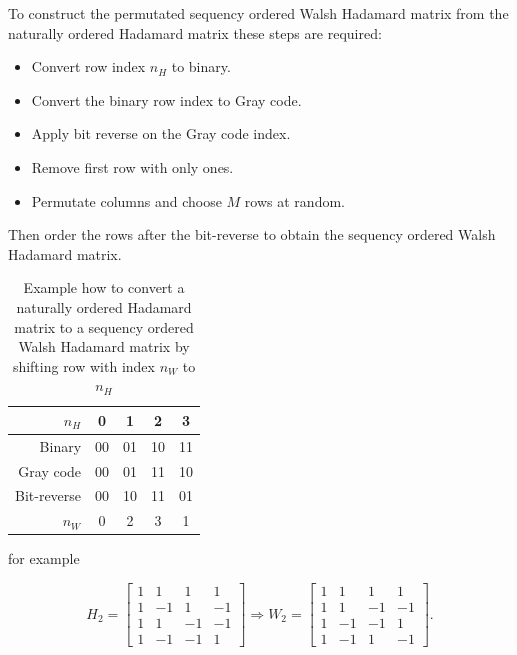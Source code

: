 To construct the permutated sequency ordered Walsh Hadamard matrix from the naturally ordered Hadamard matrix these steps are required:

\begin{itemize}
    \item Convert row index $n_H$ to binary.
    \item Convert the binary row index to Gray code.
    \item Apply bit reverse on the Gray code index.
    \item Remove first row with only ones.
    \item Permutate columns and choose $M$ rows at random.
\end{itemize}

Then order the rows after the bit-reverse to obtain the sequency ordered Walsh Hadamard matrix.

\begin{table}[H]
\begin{tabular}{|r|c|c|c|c|}
\hline
    $n_H$        & 0    & 1     & 2     & 3     \\ \hline
    Binary       & 00   & 01    & 10    & 11    \\ \hline
    Gray code    & 00   & 01    & 11    & 10    \\ \hline
    Bit-reverse  & 00   & 10    & 11    & 01    \\ \hline
    $n_W$        & 0    & 2     & 3     & 1     \\ \hline
    
\end{tabular}
	\label{tab:Hadamard_2_Walsh}
	\caption{Example how to convert a naturally ordered Hadamard matrix to a sequency ordered Walsh Hadamard matrix by shifting row with index $n_W$ to $n_H$}
\end{table}

for example

\begin{equation}
    H_2 =  \begin{bmatrix}
       1 & 1 & 1 & 1 \\
       1 & -1 & 1 & -1 \\
       1 & 1 & -1 & -1 \\
       1 & -1 & -1 & 1 
       \end{bmatrix} \Rightarrow W_2 = \begin{bmatrix}
       1 & 1 & 1 & 1 \\
       1 & 1 & -1 & -1  \\
       1 & -1 & -1 & 1  \\
       1 & -1 & 1 & -1 
       \end{bmatrix}.
\end{equation}

